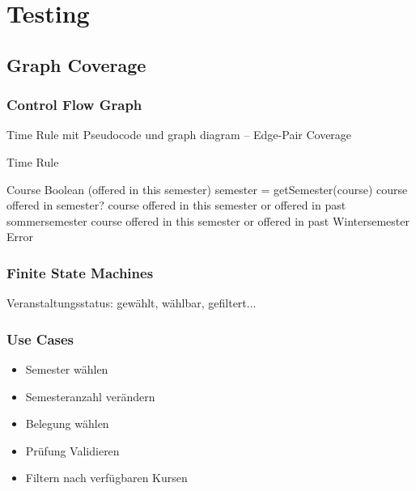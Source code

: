 \documentclass[ngerman]{article}
\begin{document}

\section{Testing}

\subsection{Graph Coverage}

\subsubsection{Control Flow Graph}
Time Rule mit Pseudocode und graph diagram -- Edge-Pair Coverage
\begin{algorithm}
\caption{Time Rule}
\begin{algorithmic}[1]
     Course
    \ENSURE Boolean (offered in this semester)
    \STATE semester = getSemester(course)
        \RETURN course offered in semester?
    \ELSE
                \RETURN course offered in this semester or offered in past sommersemester
            \ELSE
                    \RETURN course offered in this semester or offered in past Wintersemester
                \ELSE
                    \RETURN Error
                \ENDIF
            \ENDIF
    \ENDIF
\end{algorithmic}
\end{algorithm}

\subsubsection{Finite State Machines}
Veranstaltungsstatus: gewählt, wählbar, gefiltert...


\subsubsection{Use Cases}

\begin{itemize}
    \item Semester wählen
    \item Semesteranzahl verändern
    \item Belegung wählen
    \item Prüfung Validieren
    \item Filtern nach verfügbaren Kursen
\end{itemize}
\end{document}
